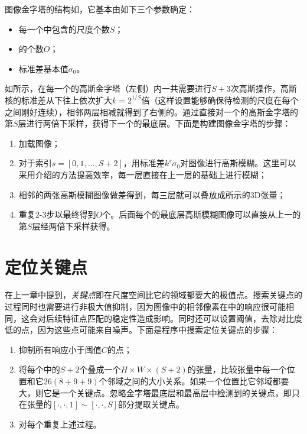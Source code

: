 \DoG 图像金字塔的结构如，它基本由如下三个参数确定：
\begin{itemize}
	\item 每一个\octave 中包含的尺度个数$S$；
	\item \octave 的个数$O$；
	\item 标准差基本值$\sigma_0$。
\end{itemize}

如所示，在每一个\octave 的高斯金字塔（左侧）内一共需要进行$S+3$次高斯操作，高斯核的标准差从下往上依次扩大$k=2^{1/S}$倍（这样设置能够确保待检测的尺度在每个\octave 之间刚好连续），相邻两层相减就得到了右侧的\DoG 。通过直接对一个\octave 的高斯金字塔的第$S$层进行两倍下采样，获得下一个\octave 的最底层。下面是构建\DoG 图像金字塔的步骤：
\begin{enumerate}
	\item 加载图像；
	\item 对于索引$s=[0, 1, \ldots, S+2]$，用标准差$k^s\sigma_0$对图像进行高斯模糊。这里可以采用介绍的方法提高效率，每一层直接在上一层的基础上进行模糊；
	\item 相邻的两张高斯模糊图像做差得到\DoG，每三层\DoG 就可以叠放成所示的3D张量；
	\item 重复2-3步以最终得到$O$个\octave 。后面每个\octave 的最底层高斯模糊图像可以直接从上一\octave 的第$S$层经两倍下采样获得。
\end{enumerate}

\section{定位关键点}

在上一章中提到，\emph{关键点}即在\DoG 尺度空间比它的领域都要大的极值点。搜索关键点的过程同时也需要进行非极大值抑制，因为图像中的相邻像素在\DoG 中的响应很可能相同，这会对后续特征点匹配的稳定性造成影响。同时还可以设置阈值，去除对比度低的点，因为这些点可能来自噪声。下面是程序中搜索定位关键点的步骤：
\begin{enumerate}
	\item 抑制所有响应小于阈值$C$的点；
	\item 将每个\octave 中的$S+2$个\DoG 叠成一个$H\times W\times (S+2)$的张量，比较张量中每一个位置和它$26(8+9+9)$个邻域之间的大小关系。如果一个位置比它邻域都要大，则它是一个关键点。忽略\DoG 金字塔最底层和最高层中检测到的关键点，即只在张量的$[\cdot, \cdot, 1]\sim [\cdot, \cdot, S]$部分提取关键点。
	\item 对每个\octave 重复上述过程。
\end{enumerate}



